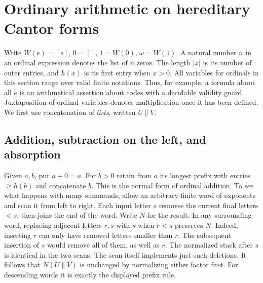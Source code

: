 \section{Ordinary arithmetic on hereditary Cantor forms}\label{sec:ordinary}
Write $W(e)=[e]$, $0=[]$, $1=W(0)$, $\omega=W(1)$.
A natural number $n$ in an ordinal expression denotes the list of $n$ zeros.
The length $|x|$ is its number of outer entries, and $h(x)$ is its first
entry when $x>0$. All variables for ordinals in this section range over
valid finite notations. Thus, for example, a formula about all $e$ is an
arithmetical assertion about codes with a decidable validity guard.
Juxtaposition of ordinal variables denotes multiplication once it has been
defined. We first use concatenation of \emph{lists}, written $U\mathbin{\|}V$.

\subsection{Addition, subtraction on the left, and absorption}
Given $a,b$, put $a+0=a$. For $b>0$ retain from $a$ its longest prefix
with entries $\ge h(b)$ and concatenate $b$. This is the normal form of
ordinal addition. To see what happens with many summands, allow an arbitrary
finite word of exponents and scan it from left to right. Each input letter
$s$ removes the current final letters $<s$, then joins the end of the word.
Write $N$ for the result. In any surrounding word, replacing adjacent letters
$r,s$ with $s$ when $r<s$ preserves $N$. Indeed, inserting $r$ can only
have removed letters smaller than $r$. The subsequent insertion of $s$
would remove all of them, as well as $r$. The normalized stack after $s$
is identical in the two scans. The scan itself implements just such
deletions. It follows that $N(U\mathbin{\|}V)$ is unchanged by normalizing
either factor first. For descending words it is exactly the displayed
prefix rule.

